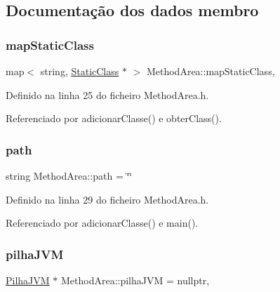 \subsection{Documentação dos dados membro}
\mbox{\label{classMethodArea_aacecebeabf7f239bfb2ccafe7d11cf63}} 
\subsubsection{\texorpdfstring{map\+Static\+Class}{mapStaticClass}}
{\footnotesize\ttfamily map$<$ string, \hyperlink{classStaticClass}{Static\+Class} $\ast$ $>$ Method\+Area\+::map\+Static\+Class\hspace{0.3cm}{\ttfamily [static]}, {\ttfamily [private]}}



Definido na linha 25 do ficheiro Method\+Area.\+h.



Referenciado por adicionar\+Classe() e obter\+Class().

\mbox{\label{classMethodArea_a5fba57684c1552a65932306870b1130c}} 
\subsubsection{\texorpdfstring{path}{path}}
{\footnotesize\ttfamily string Method\+Area\+::path = \char`\"{}\char`\"{}\hspace{0.3cm}{\ttfamily [static]}}



Definido na linha 29 do ficheiro Method\+Area.\+h.



Referenciado por adicionar\+Classe() e main().

\mbox{\label{classMethodArea_aed878aaa6b44b11cd9446527c447ede9}} 
\subsubsection{\texorpdfstring{pilha\+J\+VM}{pilhaJVM}}
{\footnotesize\ttfamily \hyperlink{classPilhaJVM}{Pilha\+J\+VM} $\ast$ Method\+Area\+::pilha\+J\+VM = nullptr\hspace{0.3cm}{\ttfamily [static]}, {\ttfamily [private]}}



